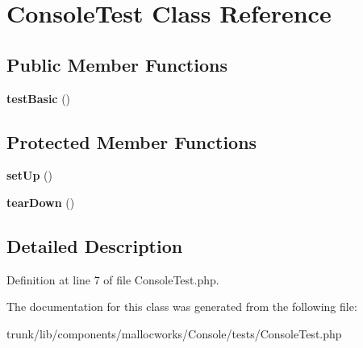 \hypertarget{class_console_test}{
\section{ConsoleTest Class Reference}
\label{class_console_test}
}
\subsection*{Public Member Functions}
\begin{DoxyCompactItemize}
\item 
\hypertarget{class_console_test_a43130cb481135ee931f1562a1503378a}{
{\bfseries testBasic} ()}
\label{class_console_test_a43130cb481135ee931f1562a1503378a}

\end{DoxyCompactItemize}
\subsection*{Protected Member Functions}
\begin{DoxyCompactItemize}
\item 
\hypertarget{class_console_test_a0bc688732d2b3b162ffebaf7812e78da}{
{\bfseries setUp} ()}
\label{class_console_test_a0bc688732d2b3b162ffebaf7812e78da}

\item 
\hypertarget{class_console_test_a80fe3d17e658907fc75346a0ec9d6fc7}{
{\bfseries tearDown} ()}
\label{class_console_test_a80fe3d17e658907fc75346a0ec9d6fc7}

\end{DoxyCompactItemize}


\subsection{Detailed Description}


Definition at line 7 of file ConsoleTest.php.



The documentation for this class was generated from the following file:\begin{DoxyCompactItemize}
\item 
trunk/lib/components/mallocworks/Console/tests/ConsoleTest.php\end{DoxyCompactItemize}
